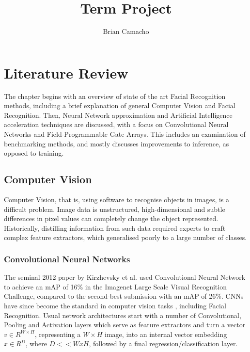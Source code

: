 \documentclass[12pt]{article}
\title{Term Project}
\author{Brian Camacho}
\begin{document}
\maketitle

\newpage
{}

\section{Literature Review}
The chapter begins with an overview of state of the art Facial Recognition methods, including a brief explanation of general Computer Vision and Facial Recognition.
Then, Neural Network approximation and Artificial Intelligence acceleration techniques are discussed, with a focus on Convolutional Neural Networks and Field-Programmable Gate Arrays. This includes an  examination of benchmarking methods, and mostly discusses improvements to inference, as opposed to training.
\subsection{Computer Vision}
Computer Vision, that is, using software to recognise objects in images, is a difficult problem. Image data is unstructured, high-dimensional and subtle differences in pixel values can completely change the object represented\cite{prince2012computer}.
Historically, distilling information from such data required experts to craft complex feature extractors, which generalised poorly to a large number of classes.
\subsubsection{Convolutional Neural Networks}
The seminal 2012 paper by Kirzhevsky et al. used Convolutional Neural Network to achieve an mAP of 16\% in the Imagenet Large Scale Visual Recognition Challenge, compared to the second-best submission with an mAP of 26\%\cite{ILSVRC15}.
CNNs have since become the standard in computer vision tasks \cite{sze2017efficient}, including Facial Recognition.
Usual network architectures start with a number of Convolutional, Pooling and Activation layers which serve as feature extractors and turn a vector $v \in R^{W\times H}$, representing a $W\times H$ image, into an internal vector embedding $x \in R^D$, where $D << WxH$, followed by a final regression/classification layer.
\end{document}
